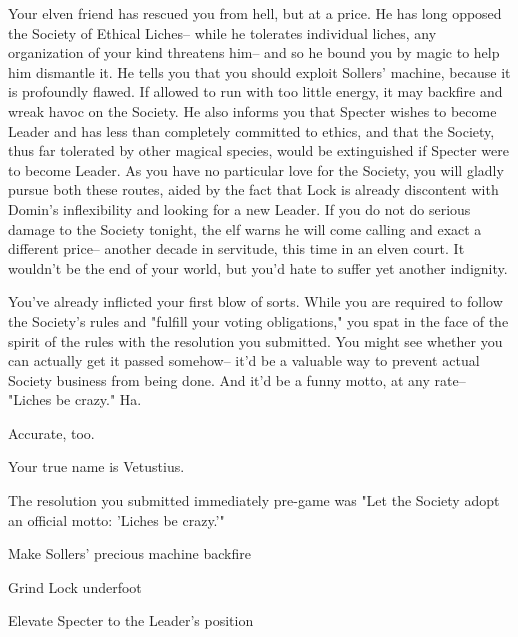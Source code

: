 \documentclass[char]{Sel}
\begin{document}
Your elven friend has rescued you from hell, but at a price. He has long opposed the Society of Ethical Liches-- while he tolerates individual liches, any organization of your kind threatens him-- and so he bound you by magic to help him dismantle it. He tells you that you should exploit Sollers’ machine, because it is profoundly flawed. If allowed to run with too little energy, it may backfire and wreak havoc on the Society. He also informs you that Specter wishes to become Leader and has less than completely committed to ethics, and that the Society, thus far tolerated by other magical species, would be extinguished if Specter were to become Leader. As you have no particular love for the Society, you will gladly pursue both these routes, aided by the fact that Lock is already discontent with Domin’s inflexibility and looking for a new Leader. If you do not do serious damage to the Society tonight, the elf warns he will come calling and exact a different price-- another decade in servitude, this time in an elven court. It wouldn’t be the end of your world, but you’d hate to suffer yet another indignity.

You’ve already inflicted your first blow of sorts. While you are required to follow the Society’s rules and "fulfill your voting obligations," you spat in the face of the spirit of the rules with the resolution you submitted. You might see whether you can actually get it passed somehow-- it’d be a valuable way to prevent actual Society business from being done. And it’d be a funny motto, at any rate-- "Liches be crazy." Ha.

Accurate, too.

\begin{itemz}[Notes]
  \item Your true name is Vetustius.
  \item The resolution you submitted immediately pre-game was "Let the Society adopt an official motto: 'Liches be crazy.'"
    \end{itemz}
    
 \begin{itemz}[Goals]
\item Make Sollers' precious machine backfire
\item Grind Lock underfoot
\item Elevate Specter to the Leader's position
\end{itemz}
\end{document}
